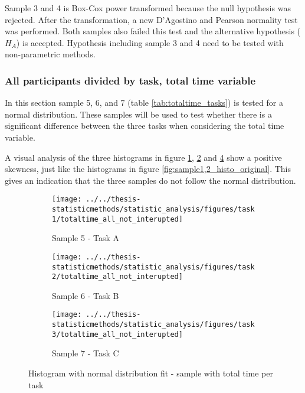 Sample 3 and 4 is Box-Cox power transformed because the null hypothesis was rejected. After the transformation, a new D'Agostino and Pearson normality test was performed. Both samples also failed this test and the alternative hypothesis ($H_A$) is accepted. Hypothesis including sample 3 and 4 need to be tested with non-parametric methods. 

\subsubsection[Sample 5, 6 and 7]{All participants divided by task, total time variable}\label{sec:task123_time_normaltest}

In this section sample 5, 6, and 7 (table \ref{tab:totaltime_tasks}) is tested for a normal distribution. These samples will be used to test whether there is a significant difference between the three tasks when considering the total time variable. 

A visual analysis of the three histograms in figure \ref{fig:totaltimeallnotinterupted_task1}, \ref{fig:totaltimeallnotinterupted_task2} and \ref{fig:totaltimeallnotinterupted_task3} show a positive skewness, just like the histograms in figure \ref{fig:sample1,2_histo_original}. This gives an indication that the three samples do not follow the normal distribution. 

\begin{figure}[H]
	\centering
	\begin{subfigure}[b]{0.32\textwidth}
		\centering
		\texttt{[image: ../../thesis-statisticmethods/statistic\_analysis/figures/task1/totaltime\_all\_not\_interupted]}
		\caption{Sample 5 - Task A}
		\label{fig:totaltimeallnotinterupted_task1}
	\end{subfigure}
	\begin{subfigure}[b]{0.32\textwidth}
		\centering
		\texttt{[image: ../../thesis-statisticmethods/statistic\_analysis/figures/task2/totaltime\_all\_not\_interupted]}
		\caption{Sample 6 - Task B}
		\label{fig:totaltimeallnotinterupted_task2}
	\end{subfigure}
	\begin{subfigure}[b]{0.32\textwidth}
		\centering
		\texttt{[image: ../../thesis-statisticmethods/statistic\_analysis/figures/task3/totaltime\_all\_not\_interupted]}
		\caption{Sample 7 - Task C}
		\label{fig:totaltimeallnotinterupted_task3}
	\end{subfigure}
	\caption{Histogram with normal distribution fit - sample with total time per task}
\end{figure}

